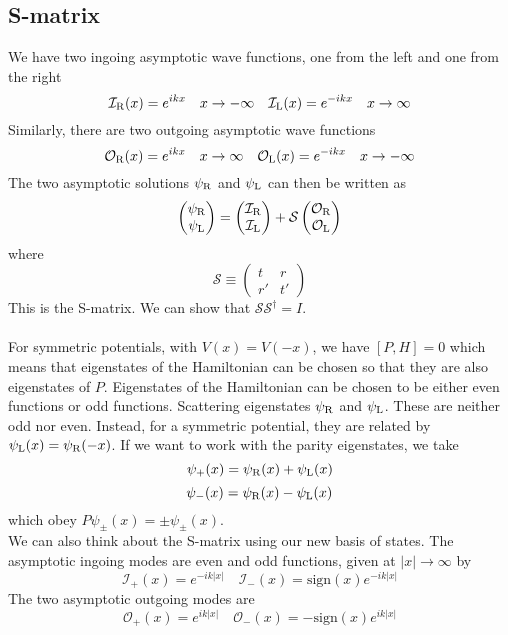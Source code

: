 \subsection{S-matrix}
We have two ingoing asymptotic wave functions, one from the left and one from the right
\[\mathcal{I}_{\rm R}(x) = e^{ikx} \quad x \to -\infty \quad \mathcal{I}_{\rm L}(x) = e^{-ikx} \quad x \to \infty\]
Similarly, there are two outgoing asymptotic wave functions
\[\mathcal{O}_{\rm R}(x) = e^{ikx} \quad x \to \infty \quad \mathcal{O}_{\rm L}(x) = e^{-ikx} \quad x \to -\infty\]
The two asymptotic solutions $\psi_{\rm R}$ and $\psi_{\rm L}$ can then be written as
\[\begin{pmatrix} \psi_{\rm R} \\ \psi_{\rm L} \end{pmatrix} =  
\begin{pmatrix} \mathcal{I}_{\rm R} \\ \mathcal{I}_{\rm L} \end{pmatrix} + 
\mathcal{S} \begin{pmatrix} \mathcal{O}_{\rm R} \\ \mathcal{O}_{\rm L} \end{pmatrix}\]
where
\[\mathcal{S} \equiv \begin{pmatrix}
t & r \\ r' & t'
\end{pmatrix} \]
This is the S-matrix. We can show that $\mathcal{S}\mathcal{S}^{\dagger} = I$.
\\ \\
For symmetric potentials, with $V (x) = V (-x)$, we have $[P, H] = 0$ which means that eigenstates of the Hamiltonian can be chosen so that they are also eigenstates of $P$. Eigenstates of the Hamiltonian can
be chosen to be either even functions or odd functions.
Scattering eigenstates $\psi_{\rm R}$ and $\psi_{\rm L}$. These are neither odd nor even. Instead, for a symmetric potential, they are related by $\psi_{\rm L} (x) = \psi_{\rm R} (-x)$. If we want to work with the parity
eigenstates, we take
\[\psi_{+}(x) = \psi_{\rm R}(x) + \psi_{\rm L}(x)\]
\[\psi_{-}(x) = \psi_{\rm R}(x) - \psi_{\rm L}(x)\]
which obey $P\psi_{\pm}(x) = \pm \psi_{\pm}(x)$.
\\
We can also think about the S-matrix using our new basis of states. The asymptotic ingoing modes are even and odd functions, given at $|x| \to \infty$ by
\[\mathcal{I}_{+}(x) = e^{-ik|x|} \quad \mathcal{I}_{-}(x) = \mathrm{sign}(x) e^{-ik|x|}\]
The two asymptotic outgoing modes are
\[\mathcal{O}_{+}(x) = e^{ik|x|} \quad \mathcal{O}_{-}(x) = -\mathrm{sign}(x) e^{ik|x|}\]
